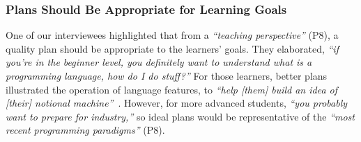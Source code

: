 





 

\subsubsection{Plans Should Be Appropriate for Learning Goals}%
\label{sec:learning-goals}

One of our interviewees highlighted that from a \textit{``teaching perspective''} (P8), a quality plan should be appropriate to the learners' goals. They elaborated, \textit{``if you're in the beginner level, you definitely want to understand what is a programming language, how do I do stuff?''} For those learners, better plans illustrated the operation of language features, to \textit{``help [them] build an idea of [their] notional machine''}~\cite{sorva_notional_2013}. However, for more advanced students, \textit{``you probably want to prepare for industry,''} so ideal plans would be representative of the \textit{``most recent programming paradigms''} (P8). 



